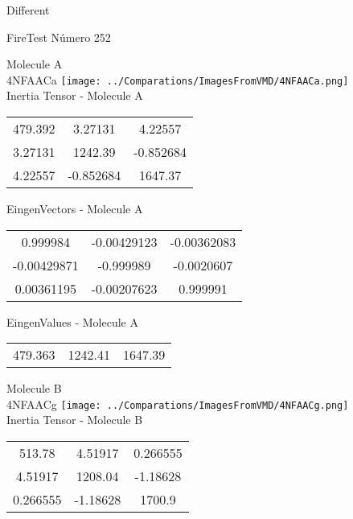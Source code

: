 \begin{center}
\vtab
\vtab
\textcolor{NavyBlue}{\Large Different}
\end{center}

 \newpage

\vtab[-2cm]
\begin{center}
{\large FireTest \tab Número 252}
\end{center}
\begin{multicols}{2}
\begin{center}

Molecule A \\ 
4NFAACa
\texttt{[image: ../Comparations/ImagesFromVMD/4NFAACa.png]}
\\
Inertia Tensor - Molecule A \\
\vtab

\begin{tabular}{|c c c|}
479.392	 & 	3.27131	 & 	4.22557	 \\
3.27131	 & 	1242.39	 & 	-0.852684	 \\
4.22557	 & 	-0.852684	 & 	1647.37
\end{tabular}

\vtab
 EingenVectors - Molecule A     \\
\vtab
\begin{tabular}{|c c c|}
0.999984	 & 	-0.00429123	 & 	-0.00362083	 \\
-0.00429871	 & 	-0.999989	 & 	-0.0020607	 \\
0.00361195	 & 	-0.00207623	 & 	0.999991
\end{tabular}

\vtab
 EingenValues - Molecule A     \\
\vtab
\begin{tabular}{|c c c|}
479.363	 & 	1242.41	 & 	1647.39	 \\
\end{tabular}
\columnbreak

Molecule B \\ 
4NFAACg
\texttt{[image: ../Comparations/ImagesFromVMD/4NFAACg.png]}
\\
Inertia Tensor - Molecule B \\
\vtab

\begin{tabular}{|c c c|}
513.78	 & 	4.51917	 & 	0.266555	 \\
4.51917	 & 	1208.04	 & 	-1.18628	 \\
0.266555	 & 	-1.18628	 & 	1700.9
\end{tabular}


\end{center}
\end{multicols}

